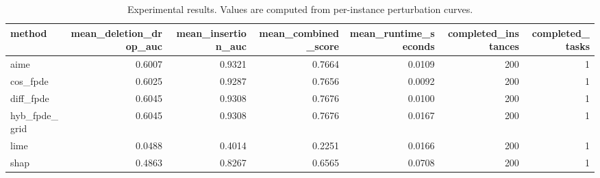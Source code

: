 \begin{table}[t]
\caption{Experimental results. Values are computed from per-instance perturbation curves.}
\label{tab:main_results_computed}
\centering
\begin{tabular}{lrrrrrr}
\toprule
method & mean\_deletion\_drop\_auc & mean\_insertion\_auc & mean\_combined\_score & mean\_runtime\_seconds & completed\_instances & completed\_tasks \\
\midrule
aime & 0.6007 & 0.9321 & 0.7664 & 0.0109 & 200 & 1 \\
cos\_fpde & 0.6025 & 0.9287 & 0.7656 & 0.0092 & 200 & 1 \\
diff\_fpde & 0.6045 & 0.9308 & 0.7676 & 0.0100 & 200 & 1 \\
hyb\_fpde\_grid & 0.6045 & 0.9308 & 0.7676 & 0.0167 & 200 & 1 \\
lime & 0.0488 & 0.4014 & 0.2251 & 0.0166 & 200 & 1 \\
shap & 0.4863 & 0.8267 & 0.6565 & 0.0708 & 200 & 1 \\
\bottomrule
\end{tabular}

\end{table}
